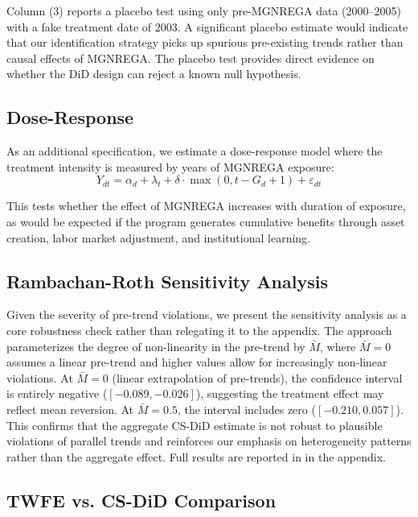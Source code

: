 \documentclass[12pt]{article}
\begin{document}
Column (3) reports a placebo test using only pre-MGNREGA data (2000--2005) with a fake treatment date of 2003. A significant placebo estimate would indicate that our identification strategy picks up spurious pre-existing trends rather than causal effects of MGNREGA. The placebo test provides direct evidence on whether the DiD design can reject a known null hypothesis.

\subsection{Dose-Response}

As an additional specification, we estimate a dose-response model where the treatment intensity is measured by years of MGNREGA exposure:
\begin{equation}
Y_{dt} = \alpha_d + \lambda_t + \delta \cdot \max(0, t - G_d + 1) + \varepsilon_{dt}
\end{equation}

This tests whether the effect of MGNREGA increases with duration of exposure, as would be expected if the program generates cumulative benefits through asset creation, labor market adjustment, and institutional learning.

\subsection{Rambachan-Roth Sensitivity Analysis}

Given the severity of pre-trend violations, we present the \citet{rambachan2023more} sensitivity analysis as a core robustness check rather than relegating it to the appendix. The approach parameterizes the degree of non-linearity in the pre-trend by $\bar{M}$, where $\bar{M} = 0$ assumes a linear pre-trend and higher values allow for increasingly non-linear violations. At $\bar{M} = 0$ (linear extrapolation of pre-trends), the confidence interval is entirely negative ($[-0.089, -0.026]$), suggesting the treatment effect may reflect mean reversion. At $\bar{M} = 0.5$, the interval includes zero ($[-0.210, 0.057]$). This confirms that the aggregate CS-DiD estimate is not robust to plausible violations of parallel trends and reinforces our emphasis on heterogeneity patterns rather than the aggregate effect. Full results are reported in  in the appendix.

\subsection{TWFE vs. CS-DiD Comparison}
\end{document}
